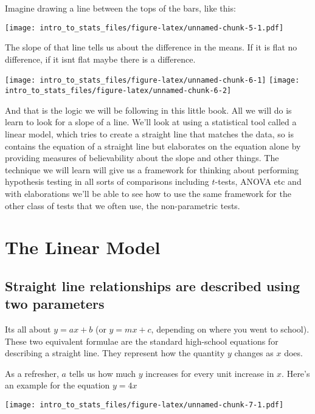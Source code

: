 \documentclass[]{book}
\begin{document}
Imagine drawing a line between the tops of the bars, like this:

\texttt{[image: intro\_to\_stats\_files/figure-latex/unnamed-chunk-5-1.pdf]}

The slope of that line tells us about the difference in the means. If it is flat no difference, if it isnt flat maybe there is a difference.

\texttt{[image: intro\_to\_stats\_files/figure-latex/unnamed-chunk-6-1]} \texttt{[image: intro\_to\_stats\_files/figure-latex/unnamed-chunk-6-2]}

And that is the logic we will be following in this little book. All we will do is learn to look for a slope of a line. We'll look at using a statistical tool called a linear model, which tries to create a straight line that matches the data, so is contains the equation of a straight line but elaborates on the equation alone by providing measures of believability about the slope and other things. The technique we will learn will give us a framework for thinking about performing hypothesis testing in all sorts of comparisons including \(t\)-tests, ANOVA etc and with elaborations we'll be able to see how to use the same framework for the other class of tests that we often use, the non-parametric tests.

\hypertarget{the-linear-model}{%
\chapter{The Linear Model}\label{the-linear-model}}

\hypertarget{straight-line-relationships-are-described-using-two-parameters}{%
\section{Straight line relationships are described using two parameters}\label{straight-line-relationships-are-described-using-two-parameters}}

Its all about \(y = ax + b\) (or \(y = mx + c\), depending on where you went to school). These two equivalent formulae are the standard high-school equations for describing a straight line. They represent how the quantity \(y\) changes as \(x\) does.

As a refresher, \(a\) tells us how much \(y\) increases for every unit increase in \(x\). Here's an example for the equation \(y = 4x\)

\texttt{[image: intro\_to\_stats\_files/figure-latex/unnamed-chunk-7-1.pdf]}
\end{document}
